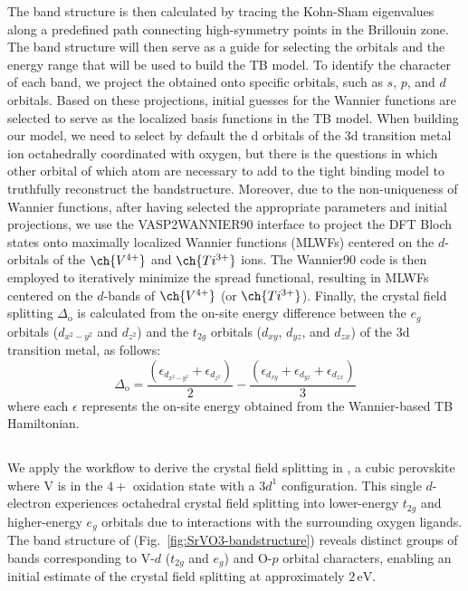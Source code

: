 \documentclass[%
 reprint,
 amsmath,amssymb,
 aps,
]{revtex4-2}
\begin{document}
The band structure is then calculated by tracing the Kohn-Sham eigenvalues along a predefined path connecting high-symmetry points in the Brillouin zone. The band structure will then serve as a guide for selecting the orbitals and the energy range that will be used to build the TB model.
 To identify the character of each band, we project the obtained onto specific orbitals, such as \(s\), \(p\), and \(d\) orbitals. Based on these projections, initial guesses for the Wannier functions are selected to serve as the localized basis functions in the TB model. When building our model, we need to select by default the d orbitals of the 3d transition metal ion octahedrally coordinated with oxygen, but there is the questions in which other orbital of which atom are necessary to add to the tight binding model to truthfully reconstruct the bandstructure. Moreover, due to the non-uniqueness of Wannier functions\cite{CFTWannier}, after having selected the appropriate parameters and initial projections, we use the VASP2WANNIER90 interface \cite{Franchini2012} to project the DFT Bloch states onto maximally localized Wannier functions (MLWFs) centered on the \(d\)-orbitals of the \(\ch{V^{4+}}\) and \(\ch{Ti^{3+}}\) ions.  The Wannier90 code \cite{Mostofi2014} is then employed to iteratively minimize the spread functional, resulting in MLWFs centered on the \(d\)-bands of \(\ch{V^{4+}}\) (or  \(\ch{Ti^{3+}}\)).
Finally, the crystal field splitting \(\Delta_{\text{o}}\) is calculated from the on-site energy difference between the \(e_g\) orbitals (\(d_{x^2-y^2}\) and \(d_{z^2}\)) and the \(t_{2g}\) orbitals (\(d_{xy}\), \(d_{yz}\), and \(d_{zx}\)) of the 3d transition metal, as follows:
\begin{equation}
   \Delta_{\text{o}} = \frac{\left( \epsilon_{d_{x^2-y^2}} + \epsilon_{d_{z^2}} \right)}{2} - \frac{\left( \epsilon_{d_{xy}} + \epsilon_{d_{yz}} + \epsilon_{d_{zx}} \right)}{3}
\end{equation}
where each \(\epsilon\) represents the on-site energy obtained from the Wannier-based TB Hamiltonian.
\subsection{}

We apply the workflow to derive the crystal field splitting in , a cubic perovskite where V is in the \(4+\) oxidation state with a \(3d^1\) configuration. This single \(d\)-electron experiences octahedral crystal field splitting into lower-energy \(t_{2g}\) and higher-energy \(e_g\) orbitals due to interactions with the surrounding oxygen ligands. The band structure of  (Fig.~\ref{fig:SrVO3-bandstructure}) reveals distinct groups of bands corresponding to V-\(d\) (\(t_{2g}\) and \(e_g\)) and O-\(p\) orbital characters, enabling an initial estimate of the crystal field splitting at approximately \(2 \, \text{eV}\).
\end{document}

